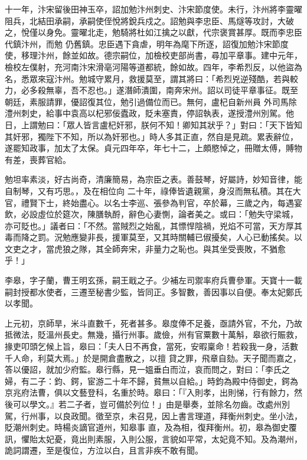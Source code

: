 \begin{pinyinscope}
 十一年，汴宋留後田神玉卒，詔加勉汴州刺史、汴宋節度使。未行，汴州將李靈曜阻兵，北結田承嗣，承嗣使侄悅將銳兵戍之。詔勉與李忠臣、馬燧等攻討，大破之，悅僅以身免。靈曜北走，勉騎將杜如江擒之以獻，代宗褒賞甚厚。既而李忠臣代鎮汴州，而勉
 仍舊鎮。忠臣遇下貪虐，明年為麾下所逐，詔復加勉汴宋節度使，移理汴州，餘並如故。德宗嗣位，加檢校吏部尚書，尋加平章事。建中元年，檢校左僕射，充河南汴宋滑亳河陽等道都統，餘如故。四年，李希烈反，以他盜為名，悉眾來寇汴州。勉城守累月，救援莫至，謂其將曰：「希烈兇逆殘酷，若與較力，必多殺無辜，吾不忍也。」遂潛師潰圍，南奔宋州。詔以司徒平章事征。既至朝廷，素服請罪，優詔復其位，勉引過備位而已。無何，盧杞自新州員
 外司馬除澧州刺史，給事中袁高以杞邪佞蠹政，貶未塞責，停詔執表，遂授澧州別駕。他日，上謂勉曰：「眾人皆言盧杞奸邪，朕何不知！卿知其狀乎？」對曰：「天下皆知其奸邪，獨陛下不知，所以為奸邪也。」時人多其正直，然自是見疏。累表辭位，遂罷知政事，加太了太保。貞元四年卒，年七十二，上頗愍悼之，冊贈太傅，賻物有差，喪葬官給。



 勉坦率素淡，好古尚奇，清廉簡易，為宗臣之表。善鼓琴，好屬詩，妙知音律，能自制琴，又有巧思。，及在相位向
 二十年，祿俸皆遺親黨，身沒而無私積。其在大官，禮賢下士，終始盡心。以名士李巡、張參為判官，卒於幕，三歲之內，每遇宴飲，必設虛位於筵次，陳膳執酹，辭色心妻惻，論者美之。或曰：「勉失守梁城，亦可貶也。」議者曰：「不然。當賊烈之始亂，其慓悍陰禍，兇焰不可當，天方厚其毒而降之罰。況勉應變非長，援軍莫至，又其時關輔已俶擾矣，人心已動搖矣。以文吏之才，當虎狼之隊，其全師奔宋，非量力之恥也。與其坐受喪敗，不猶愈乎！」



 李皋，字子蘭，曹王明玄孫，嗣王戢之子。少補左司禦率府兵曹參軍。天寶十一載嗣封授都水使者，三遷至秘書少監，皆同正。多智數，善因事以自便。奉太妃鄭氏以孝聞。



 上元初，京師旱，米斗直數千，死者甚多。皋度俸不足養，亟請外官，不允，乃故抵微法，貶溫州長史。無幾，攝行州事。歲儉，州有官粟數十萬斛，皋欲行賑救，掾吏叩頭乞候上旨，皋曰：「夫人日不再食，當死，安暇稟命！若殺我一身，活數千人命，利莫大焉。」於是開倉盡散之，以擅
 貸之罪，飛章自劾。天子聞而嘉之，答以優詔，就加少府監。皋行縣，見一媼垂白而泣，哀而問之，對曰：「李氏之婦，有二子：鈞、鍔，宦游二十年不歸，貧無以自給。」時鈞為殿中侍御史，鍔為京兆府法曹，俱以文藝登科，名重於時。皋曰：「『入則孝，出則悌，行有餘力，然後可以學文。』若二子者，豈可備於列位！」由是舉奏，並除名勿齒。改處州別駕，行州事，以良政聞。徵至京，未召見，因上書言理道，拜衡州刺史。坐小法，貶潮州刺史。時楊炎謫官道州，知皋事
 直，及為相，復拜衡州。初，皋為御史覆訊，懼貽太妃憂，竟出則素服，入則公服，言貌如平常，太妃竟不知。及為潮州，詭詞謂遷，至是復位，方泣以白，且言非疾不敢有聞。




\end{pinyinscope}
